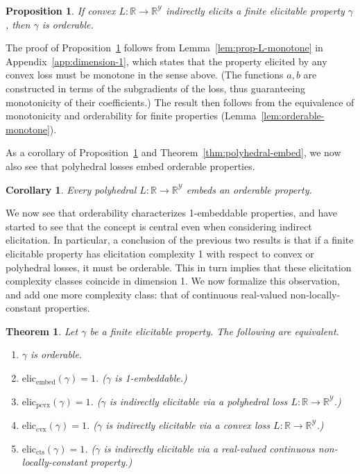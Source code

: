 \documentclass[12pt]{article}
\newcommand{\reals}{\mathbb{R}}
\newcommand{\eliccts}{\mathrm{elic}_\mathrm{cts}}
\newcommand{\eliccvx}{\mathrm{elic}_\mathrm{cvx}}
\newcommand{\elicpoly}{\mathrm{elic}_\mathrm{pcvx}}
\newcommand{\elicembed}{\mathrm{elic}_\mathrm{embed}}
\newcommand{\Y}{\mathcal{Y}}
\newtheorem{theorem}{Theorem}
\newtheorem{proposition}{Proposition}
\newtheorem{corollary}{Corollary}
\begin{document}
\begin{proposition}\label{prop:indirect-orderable}
  If convex $L : \reals \to \reals^\Y$ indirectly elicits a finite elicitable property $\gamma$, then $\gamma$ is orderable.
\end{proposition}

The proof of Proposition~\ref{prop:indirect-orderable} follows from Lemma~\ref{lem:prop-L-monotone} in Appendix~\ref{app:dimension-1}, which states that the property elicited by any convex loss must be monotone in the sense above.
(The functions $a,b$ are constructed in terms of the subgradients of the loss, thus guaranteeing monotonicity of their coefficients.)
The result then follows from the equivalence of monotonicity and orderability for finite properties (Lemma~\ref{lem:orderable-monotone}).

As a corollary of Proposition~\ref{prop:indirect-orderable} and Theorem~\ref{thm:polyhedral-embed}, we now also see that polyhedral losses embed orderable properties.

\begin{corollary}\label{cor:embed-orderable}
  Every polyhedral $L : \reals \to \reals^\Y$ embeds an orderable property.
\end{corollary}

We now see that orderability characterizes 1-embeddable properties, and have started to see that the concept is central even when considering indirect elicitation.
In particular, a conclusion of the previous two results is that if a finite elicitable property has elicitation complexity 1 with respect to convex or polyhedral losses, it must be orderable.
This in turn implies that these elicitation complexity classes coincide in dimension 1.
We now formalize this observation, and add one more complexity class: that of continuous real-valued non-locally-constant properties.

\begin{theorem}\label{thm:1d-tfae}
  Let $\gamma$ be a finite elicitable property.
  The following are equivalent.
  \begin{enumerate}\setlength{\itemsep}{0pt}
  \item $\gamma$ is orderable.
  \item $\elicembed(\gamma)=1$. ($\gamma$ is 1-embeddable.)
  \item $\elicpoly(\gamma)=1$. ($\gamma$ is indirectly elicitable via a polyhedral loss $L:\reals\to\reals^\Y$.)
  \item $\eliccvx(\gamma)=1$. ($\gamma$ is indirectly elicitable via a convex loss $L:\reals\to\reals^\Y$.)
  \item $\eliccts(\gamma)=1$. ($\gamma$ is indirectly elicitable via a real-valued continuous non-locally-constant property.)
  \end{enumerate}
\end{theorem}
\end{document}
